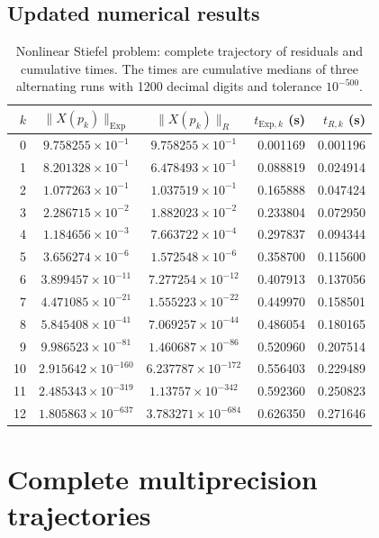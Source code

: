 \documentclass[11pt]{article}
\newcommand{\Exp}{\mathrm{Exp}}
\begin{document}
\subsection*{Updated numerical results}
\begin{table}[H]
\centering
\scriptsize
\setlength{\tabcolsep}{4.2pt}
\begin{tabular}{rccrr}
\toprule
$k$ & $\|X(p_k)\|_{\Exp}$ & $\|X(p_k)\|_R$
& $t_{\Exp,k}$ (s) & $t_{R,k}$ (s)\\
\midrule
0 & $9.758255\times10^{-1}$ & $9.758255\times10^{-1}$ & 0.001169 & 0.001196 \\
1 & $8.201328\times10^{-1}$ & $6.478493\times10^{-1}$ & 0.088819 & 0.024914 \\
2 & $1.077263\times10^{-1}$ & $1.037519\times10^{-1}$ & 0.165888 & 0.047424 \\
3 & $2.286715\times10^{-2}$ & $1.882023\times10^{-2}$ & 0.233804 & 0.072950 \\
4 & $1.184656\times10^{-3}$ & $7.663722\times10^{-4}$ & 0.297837 & 0.094344 \\
5 & $3.656274\times10^{-6}$ & $1.572548\times10^{-6}$ & 0.358700 & 0.115600 \\
6 & $3.899457\times10^{-11}$ & $7.277254\times10^{-12}$ & 0.407913 & 0.137056 \\
7 & $4.471085\times10^{-21}$ & $1.555223\times10^{-22}$ & 0.449970 & 0.158501 \\
8 & $5.845408\times10^{-41}$ & $7.069257\times10^{-44}$ & 0.486054 & 0.180165 \\
9 & $9.986523\times10^{-81}$ & $1.460687\times10^{-86}$ & 0.520960 & 0.207514 \\
10 & $2.915642\times10^{-160}$ & $6.237787\times10^{-172}$ & 0.556403 & 0.229489 \\
11 & $2.485343\times10^{-319}$ & $1.13757\times10^{-342}$ & 0.592360 & 0.250823 \\
12 & $1.805863\times10^{-637}$ & $3.783271\times10^{-684}$ & 0.626350 & 0.271646 \\
\bottomrule
\end{tabular}
\caption{Nonlinear Stiefel problem: complete trajectory of residuals and cumulative times. The times are cumulative medians of three alternating runs with 1200 decimal digits and tolerance $10^{-500}$.}
\label{tab:supp_stiefel_nonlinear}
\end{table}

\section{Complete multiprecision trajectories}
\label{sec:supp_trajectories}
\end{document}
